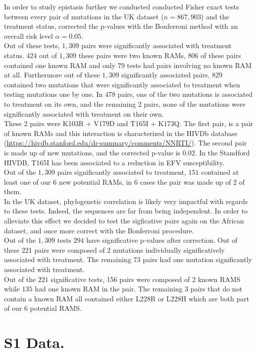 \documentclass[
  11,
]{scrbook}
\begin{document}
In order to study epistasis further we conducted conducted Fisher exact
tests between every pair of mutations in the UK dataset (\(n=867,903\))
and the treatment status, corrected the p-values with the Bonferroni
method with an overall risk level \(\alpha=0.05\).\\
Out of these tests, \(1,309\) pairs were significantly associated with
treatment status. \(424\) out of \(1,309\) these pairs were two known RAMs,
\(806\) of these pairs contained one known RAM and only \(79\) tests had
pairs involving no known RAM at all. Furthermore out of these \(1,309\)
significantly associated pairs, \(829\) contained two mutations that were
significantly associated to treatment when testing mutations one by one.
In \(478\) pairs, one of the two mutations is associated to treatment on
its own, and the remaining 2 pairs, none of the mutations were
significantly associated with treatment on their own.\\
These 2 pairs were K103R + V179D and T165I + K173Q. The first pair, is a
pair of known RAMs and this interaction is characterized in the HIVDb
database (\url{https://hivdb.stanford.edu/dr-summary/comments/NNRTI/}). The
second pair is made up of new mutations, and the corrected p-value is
\(0.02\). In the Standford HIVDB, T165I has been associated to a reduction
in EFV susceptibility.\\
Out of the \(1,309\) pairs significantly associated to treatment, \(151\)
contained at least one of our 6 new potential RAMs, in \(6\) cases the
pair was made up of 2 of them.\\
In the UK dataset, phylogenetic correlation is likely very impactful
with regards to these tests. Indeed, the sequences are far from being
independent. In order to alleviate this effect we decided to test the
sigficative pairs again on the African dataset, and once more correct
with the Bonferroni procedure.\\
Out of the \(1,309\) tests \(294\) have significative p-values after
correction. Out of these \(221\) pairs were composed of 2 mutations
individually significatively associated with treatment. The remaining
\(73\) pairs had one mutation significantly associated with treatment.\\
Out of the \(221\) significative tests, 156 pairs were composed of 2 known
RAMS while \(135\) had one known RAM in the pair. The remaining 3 pairs
that do not contain a known RAM all contained either L228R or L228H
which are both part of our 6 potential RAMS.

\hypertarget{s1-data.}{%
\section{S1 Data.}\label{s1-data.}}
\end{document}
